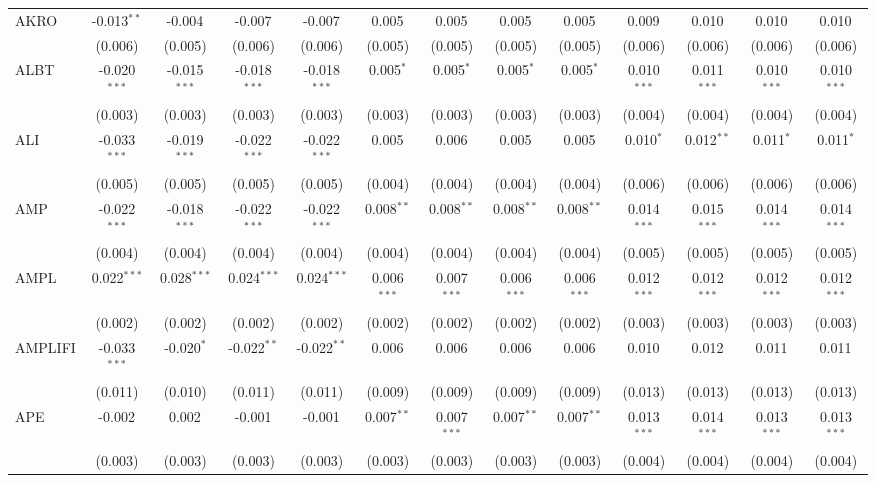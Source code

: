 \begin{table}[!htbp]
\begin{tabular}{@{\extracolsep{5pt}}lcccccccccccc}
 AKRO & -0.013$^{**}$ & -0.004$^{}$ & -0.007$^{}$ & -0.007$^{}$ & 0.005$^{}$ & 0.005$^{}$ & 0.005$^{}$ & 0.005$^{}$ & 0.009$^{}$ & 0.010$^{}$ & 0.010$^{}$ & 0.010$^{}$ \\
  & (0.006) & (0.005) & (0.006) & (0.006) & (0.005) & (0.005) & (0.005) & (0.005) & (0.006) & (0.006) & (0.006) & (0.006) \\
 ALBT & -0.020$^{***}$ & -0.015$^{***}$ & -0.018$^{***}$ & -0.018$^{***}$ & 0.005$^{*}$ & 0.005$^{*}$ & 0.005$^{*}$ & 0.005$^{*}$ & 0.010$^{***}$ & 0.011$^{***}$ & 0.010$^{***}$ & 0.010$^{***}$ \\
  & (0.003) & (0.003) & (0.003) & (0.003) & (0.003) & (0.003) & (0.003) & (0.003) & (0.004) & (0.004) & (0.004) & (0.004) \\
 ALI & -0.033$^{***}$ & -0.019$^{***}$ & -0.022$^{***}$ & -0.022$^{***}$ & 0.005$^{}$ & 0.006$^{}$ & 0.005$^{}$ & 0.005$^{}$ & 0.010$^{*}$ & 0.012$^{**}$ & 0.011$^{*}$ & 0.011$^{*}$ \\
  & (0.005) & (0.005) & (0.005) & (0.005) & (0.004) & (0.004) & (0.004) & (0.004) & (0.006) & (0.006) & (0.006) & (0.006) \\
 AMP & -0.022$^{***}$ & -0.018$^{***}$ & -0.022$^{***}$ & -0.022$^{***}$ & 0.008$^{**}$ & 0.008$^{**}$ & 0.008$^{**}$ & 0.008$^{**}$ & 0.014$^{***}$ & 0.015$^{***}$ & 0.014$^{***}$ & 0.014$^{***}$ \\
  & (0.004) & (0.004) & (0.004) & (0.004) & (0.004) & (0.004) & (0.004) & (0.004) & (0.005) & (0.005) & (0.005) & (0.005) \\
 AMPL & 0.022$^{***}$ & 0.028$^{***}$ & 0.024$^{***}$ & 0.024$^{***}$ & 0.006$^{***}$ & 0.007$^{***}$ & 0.006$^{***}$ & 0.006$^{***}$ & 0.012$^{***}$ & 0.012$^{***}$ & 0.012$^{***}$ & 0.012$^{***}$ \\
  & (0.002) & (0.002) & (0.002) & (0.002) & (0.002) & (0.002) & (0.002) & (0.002) & (0.003) & (0.003) & (0.003) & (0.003) \\
 AMPLIFI & -0.033$^{***}$ & -0.020$^{*}$ & -0.022$^{**}$ & -0.022$^{**}$ & 0.006$^{}$ & 0.006$^{}$ & 0.006$^{}$ & 0.006$^{}$ & 0.010$^{}$ & 0.012$^{}$ & 0.011$^{}$ & 0.011$^{}$ \\
  & (0.011) & (0.010) & (0.011) & (0.011) & (0.009) & (0.009) & (0.009) & (0.009) & (0.013) & (0.013) & (0.013) & (0.013) \\
 APE & -0.002$^{}$ & 0.002$^{}$ & -0.001$^{}$ & -0.001$^{}$ & 0.007$^{**}$ & 0.007$^{***}$ & 0.007$^{**}$ & 0.007$^{**}$ & 0.013$^{***}$ & 0.014$^{***}$ & 0.013$^{***}$ & 0.013$^{***}$ \\
  & (0.003) & (0.003) & (0.003) & (0.003) & (0.003) & (0.003) & (0.003) & (0.003) & (0.004) & (0.004) & (0.004) & (0.004) \\

\end{tabular}
\end{table}
